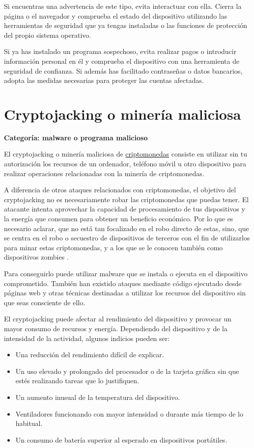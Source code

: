 \documentclass[
  spanish,
  a4paper,
  openany]{book}
\begin{document}
Si encuentras una advertencia de este tipo, evita interactuar con ella. Cierra la página o el navegador y comprueba el estado del dispositivo utilizando las herramientas de seguridad que ya tengas instaladas o las funciones de protección del propio sistema operativo.

Si ya has instalado un programa sospechoso, evita realizar pagos o introducir información personal en él y comprueba el dispositivo con una herramienta de seguridad de confianza. Si además has facilitado contraseñas o datos bancarios, adopta las medidas necesarias para proteger las cuentas afectadas.

\section{Cryptojacking o minería maliciosa}\label{cryptojacking-o-mineruxeda-maliciosa}

\textbf{Categoría: malware o programa malicioso}

El cryptojacking o minería maliciosa de \href{https://es.wikipedia.org/wiki/Criptomoneda}{criptomonedas} consiste en utilizar sin tu autorización los recursos de un ordenador, teléfono móvil u otro dispositivo para realizar operaciones relacionadas con la minería de criptomonedas.

A diferencia de otros ataques relacionados con criptomonedas, el objetivo del cryptojacking no es necesariamente robar las criptomonedas que puedas tener. El atacante intenta aprovechar la capacidad de procesamiento de tus dispositivos y la energía que consumen para obtener un beneficio económico. Por lo que es necesario aclarar, que no está tan focalizado en el robo directo de estas, sino, que se centra en el robo o secuestro de dispositivos de terceros con el fin de utilizarlos para minar estas criptomonedas, y a los que se le conocen también como dispositivos zombies \citep{cryptojacking}.

Para conseguirlo puede utilizar malware que se instala o ejecuta en el dispositivo comprometido. También han existido ataques mediante código ejecutado desde páginas web y otras técnicas destinadas a utilizar los recursos del dispositivo sin que seas consciente de ello.

El cryptojacking puede afectar al rendimiento del dispositivo y provocar un mayor consumo de recursos y energía. Dependiendo del dispositivo y de la intensidad de la actividad, algunos indicios pueden ser:

\begin{itemize}
\item
  Una reducción del rendimiento difícil de explicar.
\item
  Un uso elevado y prolongado del procesador o de la tarjeta gráfica sin que estés realizando tareas que lo justifiquen.
\item
  Un aumento inusual de la temperatura del dispositivo.
\item
  Ventiladores funcionando con mayor intensidad o durante más tiempo de lo habitual.
\item
  Un consumo de batería superior al esperado en dispositivos portátiles.
\end{itemize}
\end{document}
